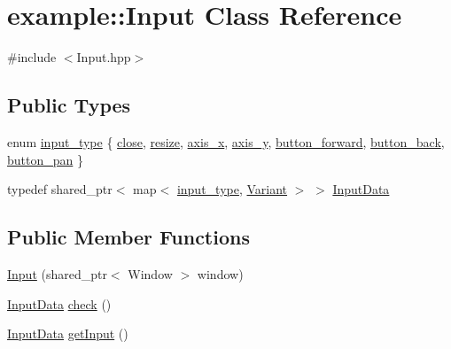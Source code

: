 \hypertarget{classexample_1_1_input}{}\section{example\+:\+:Input Class Reference}
\label{classexample_1_1_input}


{\ttfamily \#include $<$Input.\+hpp$>$}

\subsection*{Public Types}
\begin{DoxyCompactItemize}
\item 
enum \mbox{\hyperlink{classexample_1_1_input_a315efe66cfd6b49cbe0f46ab46ece59f}{input\+\_\+type}} \{ \newline
\mbox{\hyperlink{classexample_1_1_input_a315efe66cfd6b49cbe0f46ab46ece59fab257fe2f5ed273f10e2dab9437dce0d1}{close}}, 
\mbox{\hyperlink{classexample_1_1_input_a315efe66cfd6b49cbe0f46ab46ece59fa4798b64ed7b9b9c65d9a313aa9081be2}{resize}}, 
\mbox{\hyperlink{classexample_1_1_input_a315efe66cfd6b49cbe0f46ab46ece59faa88126e258a0d04e118d555d36f45b09}{axis\+\_\+x}}, 
\mbox{\hyperlink{classexample_1_1_input_a315efe66cfd6b49cbe0f46ab46ece59faf30367b3bb847290e4cb55249a3bccf5}{axis\+\_\+y}}, 
\newline
\mbox{\hyperlink{classexample_1_1_input_a315efe66cfd6b49cbe0f46ab46ece59fa1707e1d189e8fdf6adacf1aa5d4e22a9}{button\+\_\+forward}}, 
\mbox{\hyperlink{classexample_1_1_input_a315efe66cfd6b49cbe0f46ab46ece59fa379b0f4c9bbd1b78df38037a213e24dd}{button\+\_\+back}}, 
\mbox{\hyperlink{classexample_1_1_input_a315efe66cfd6b49cbe0f46ab46ece59fae744adfc1878946c23375555ec240cc3}{button\+\_\+pan}}
 \}
\item 
typedef shared\+\_\+ptr$<$ map$<$ \mbox{\hyperlink{classexample_1_1_input_a315efe66cfd6b49cbe0f46ab46ece59f}{input\+\_\+type}}, \mbox{\hyperlink{classexample_1_1_variant}{Variant}} $>$ $>$ \mbox{\hyperlink{classexample_1_1_input_af6bf4fd763ca01bd106ca3b03f162e3d}{Input\+Data}}
\end{DoxyCompactItemize}
\subsection*{Public Member Functions}
\begin{DoxyCompactItemize}
\item 
\mbox{\hyperlink{classexample_1_1_input_a7784c5ddeff5d467d26daef96cd4a303}{Input}} (shared\+\_\+ptr$<$ Window $>$ window)
\item 
\mbox{\hyperlink{classexample_1_1_input_af6bf4fd763ca01bd106ca3b03f162e3d}{Input\+Data}} \mbox{\hyperlink{classexample_1_1_input_a0a4492b08db16e638a4cd7bcf56a70ed}{check}} ()
\item 
\mbox{\hyperlink{classexample_1_1_input_af6bf4fd763ca01bd106ca3b03f162e3d}{Input\+Data}} \mbox{\hyperlink{classexample_1_1_input_a9db162ac185cdf3a9f77fb9c49158f51}{get\+Input}} ()
\end{DoxyCompactItemize}


